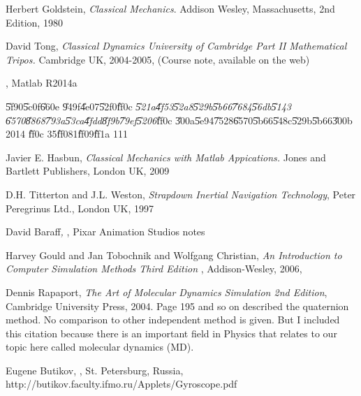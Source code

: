 \documentclass[12pt,a4paper]{article}
\begin{document}
\bigskip

\begin{thebibliography}{99}
 Herbert Goldstein, \emph{Classical Mechanics}. Addison
Wesley, Massachusetts, 2nd Edition, 1980

 David Tong, \emph{Classical Dynamics University of Cambridge
Part II Mathematical Tripos.} Cambridge UK, 2004-2005, (Course note,
available on the web)

 \href{http://www.mathworks.com/help/matlab/ordinary-differential-equations.html%
}{\underline{\color{blue}%
}}, Matlab R2014a

 \U{5f90}\U{5c0f}\U{660e} \U{949f}\U{4e07}\U{52f0}\U{ff0c}%
\textit{\U{521a}\U{4f53}\U{52a8}\U{529b}\U{5b66}\U{7684}\U{56db}\U{5143}%
\U{6570}\U{8868}\U{793a}\U{53ca}\U{4fdd}\U{8f9b}\U{79ef}\U{5206}}\U{ff0c}%
\U{300a}\U{5e94}\U{7528}\U{6570}\U{5b66}\U{548c}\U{529b}\U{5b66}\U{300b} 2014%
\U{ff0c} 35\U{ff08}1\U{ff09}\U{ff1a} 111

 Javier E. Hasbun, \emph{Classical Mechanics with Matlab
Appications.} Jones and Bartlett Publishers, London UK, 2009

 D.H. Titterton and J.L. Weston, \emph{Strapdown Inertial
Navigation Technology}, Peter Peregrinus Ltd., London UK, 1997

 David Baraff\textit{, }\href{http://graphics.cs.cmu.edu/courses/15-869-F08/lec/14/notesg.pdf%
}{\underline{\color{blue}%
}}, Pixar Animation Studios notes

 Harvey Gould and Jan Tobochnik and Wolfgang
Christian, \emph{An Introduction to Computer Simulation Methods Third Edition%
}, Addison-Wesley, 2006, \href{http://www.opensourcephysics.org/items/detail.cfm?ID=7375%
}{\underline{\color{blue}}}

 Dennis Rapaport, \emph{The Art of Molecular Dynamics
Simulation 2nd Edition}, Cambridge University Press, 2004. Page 195 and so
on described the quaternion method. No comparison to other independent
method is given. But I included this citation because there is an important
field in Physics that relates to our topic here called molecular dynamics
(MD).

 Eugene Butikov, \href{http://butikov.faculty.ifmo.ru/Applets/Gyroscope.pdf%
}{\underline{\color{blue}}},
St. Petersburg, Russia, http://butikov.faculty.ifmo.ru/Applets/Gyroscope.pdf


\end{thebibliography}
\end{document}
